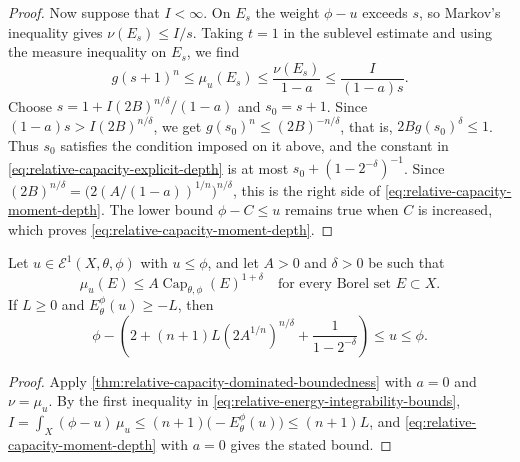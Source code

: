 \begin{proof}
Now suppose that $I<\infty$. On $E_s$ the weight $\phi-u$ exceeds $s$, so Markov's inequality gives $\nu(E_s)\leq I/s$. Taking $t=1$ in the sublevel estimate and using the measure inequality on $E_s$, we find
\[
 g(s+1)^n\leq\mu_u(E_s)\leq\frac{\nu(E_s)}{1-a}
                          \leq\frac I{(1-a)s}.
\]
Choose $s=1+I(2B)^{n/\delta}/(1-a)$ and $s_0=s+1$. Since $(1-a)s>I(2B)^{n/\delta}$, we get $g(s_0)^n\leq(2B)^{-n/\delta}$, that is, $2Bg(s_0)^\delta\leq1$. Thus $s_0$ satisfies the condition imposed on it above, and the constant in \eqref{eq:relative-capacity-explicit-depth} is at most $s_0+(1-2^{-\delta})^{-1}$. Since $(2B)^{n/\delta}=\bigl(2(A/(1-a))^{1/n}\bigr)^{n/\delta}$, this is the right side of \eqref{eq:relative-capacity-moment-depth}. The lower bound $\phi-C\leq u$ remains true when $C$ is increased, which proves \eqref{eq:relative-capacity-moment-depth}.
\end{proof}

\begin{corollary}\label{cor:relative-capacity-energy-boundedness}
Let $u\in\mathcal E^1(X,\theta,\phi)$ with $u\leq\phi$, and let $A>0$ and $\delta>0$ be such that
\[
 \mu_u(E)\leq A\operatorname{Cap}_{\theta,\phi}(E)^{1+\delta}
                         \quad\text{for every Borel set }E\subset X.
\]
If $L\geq0$ and $E_\theta^\phi(u)\geq-L$, then
\[
 \phi-\left(2+(n+1)L(2A^{1/n})^{n/\delta}
                        +\frac1{1-2^{-\delta}}\right)\leq u\leq\phi.
\]
\end{corollary}
\begin{proof}
Apply \cref{thm:relative-capacity-dominated-boundedness} with $a=0$ and $\nu=\mu_u$. By the first inequality in \eqref{eq:relative-energy-integrability-bounds}, $I=\int_X(\phi-u)\,\mu_u\leq(n+1)\bigl(-E_\theta^\phi(u)\bigr)\leq(n+1)L$, and \eqref{eq:relative-capacity-moment-depth} with $a=0$ gives the stated bound.
\end{proof}

